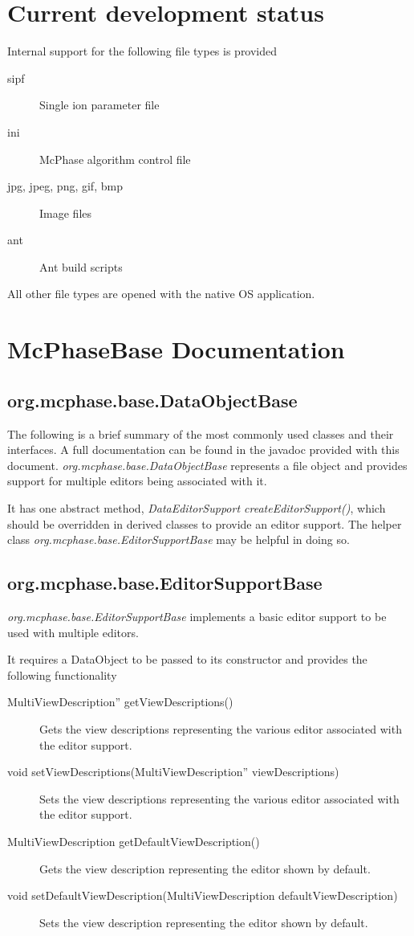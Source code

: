 \documentclass[11pt]{article}
\begin{document}
\section{Current development status}
Internal support for the following file types is provided
\begin{description}
\item[sipf]Single ion parameter file
\item[ini]McPhase algorithm control file
\item[jpg, jpeg, png, gif, bmp] Image files
\item[ant] Ant build scripts
\end{description}

All other file types are opened with the native OS application.

\section{McPhaseBase Documentation}

\subsection{org.mcphase.base.DataObjectBase}
The following is a brief summary of the most commonly used classes and their interfaces. A full documentation can be found in the javadoc provided with this document.
\emph{org.mcphase.base.DataObjectBase} represents a file object and provides support for multiple editors being associated with it. 

It has one abstract method, \emph{DataEditorSupport createEditorSupport()}, which should be overridden in derived classes to provide an editor support. The helper class \emph{org.mcphase.base.EditorSupportBase} may be helpful in doing so.

\subsection{org.mcphase.base.EditorSupportBase}
\emph{org.mcphase.base.EditorSupportBase} implements a basic editor support to be used with multiple editors.

It requires a DataObject to be passed to its constructor and provides the following functionality
\begin{description}
\item[MultiViewDescription'' getViewDescriptions()]
Gets the view descriptions representing the various editor associated with the editor support.
\item[void setViewDescriptions(MultiViewDescription'' viewDescriptions)]
Sets the view descriptions representing the various editor associated with the editor support.
\item[MultiViewDescription getDefaultViewDescription()]
Gets the view description representing the editor shown by default.
\item[void setDefaultViewDescription(MultiViewDescription defaultViewDescription)]
Sets the view description representing the editor shown by default.
\end{description}
\end{document}
